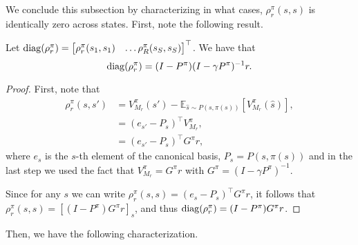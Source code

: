 We conclude this subsection by characterizing in what cases, $\rho_r^\pi(s,s)$ is identically zero across  states. First, note the following result.
\begin{tcolorbox}
\begin{lemma}\label{lemma:rho_r_pi}
    Let $ {\rm diag}(\rho_r^\pi) = \begin{bmatrix} \rho_r^\pi(s_1,s_1) & \dots \rho_R^\pi(s_S,s_S)\end{bmatrix}^\top$. We have that
    \begin{equation}
        {\rm diag}(\rho_r^\pi) = (I-P^\pi)(I-\gamma P^\pi)^{-1}r.
    \end{equation}
\end{lemma}
\end{tcolorbox}
\begin{proof}
First, note that
    \begin{align*}
    \rho_r^\pi(s,s')&= V_{M_r}^\pi(s')- \mathbb{E}_{\hat s\sim P(s,\pi(s))}[V_{M_r}^\pi(\hat s)],\\
    &=  (e_{s'} - P_s )^\top V_{M_r}^\pi ,\\
    &= (e_{s'} - P_s )^\top G^\pi r ,
\end{align*}
where $e_s$ is the $s$-th element of the canonical basis, $P_s=P(s,\pi(s))$ and in the last step we used the fact that  $V_{M_r}^\pi=G^\pi r$ with $G^\pi=(I-\gamma P^\pi)^{-1}$.

Since for any $s$ we can write $\rho_r^\pi(s,s)=(e_s-P_s)^\top G^\pi r$, it follows that $\rho_r^\pi(s,s)=[(I-P^\pi)G^\pi r]_s$, and thus ${\rm diag}(\rho_r^\pi)=(I-P^\pi)G^\pi r$.
\end{proof}
Then, we have the following characterization.

